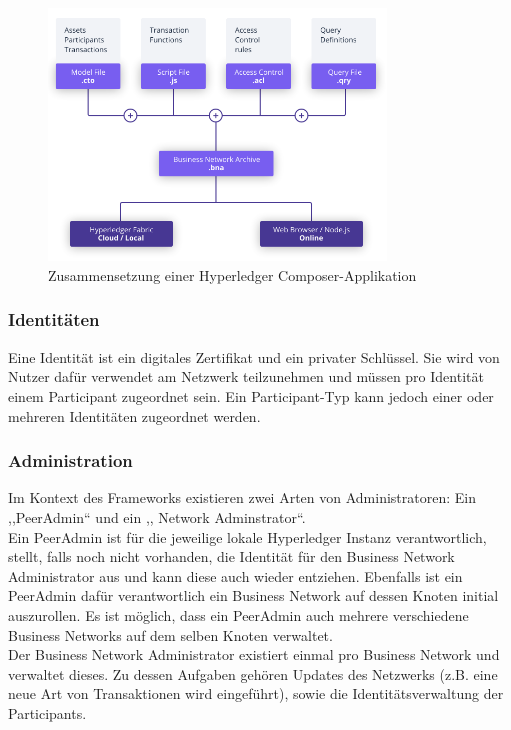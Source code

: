             \begin{figure}[H]
        		\centering
        		\includegraphics[width=0.8\textwidth]{graphics/Composer-Diagram.png}
        		\caption[Zusammensetzung einer Hyperledger Composer-Applikation]{Zusammensetzung einer Hyperledger Composer-Applikation\cite{ComposerDocs}}
        		\label{fig:composer_arch}
        	\end{figure}
        \newpage
        \subsubsection*{Identitäten}
            Eine Identität ist ein digitales Zertifikat und ein privater Schlüssel.
            Sie wird von Nutzer dafür verwendet am Netzwerk teilzunehmen und müssen pro Identität einem Participant zugeordnet sein.
            Ein Participant-Typ kann jedoch einer oder mehreren Identitäten zugeordnet werden.
            
        \subsubsection*{Administration}
            Im Kontext des Frameworks existieren zwei Arten von Administratoren: Ein ,,PeerAdmin`` und ein ,, Network Adminstrator``.\\
            Ein PeerAdmin ist für die jeweilige lokale Hyperledger Instanz verantwortlich, stellt, falls noch nicht vorhanden, die Identität für den Business Network Administrator aus und kann diese auch wieder entziehen. 
            Ebenfalls ist ein PeerAdmin dafür verantwortlich ein Business Network auf dessen Knoten initial auszurollen.
            Es ist möglich, dass ein PeerAdmin auch mehrere verschiedene Business Networks auf dem selben Knoten verwaltet.
            \medskip\\
            Der Business Network Administrator existiert einmal pro Business Network und verwaltet dieses.
            Zu dessen Aufgaben gehören Updates des Netzwerks (z.B. eine neue Art von Transaktionen wird eingeführt), sowie die Identitätsverwaltung der Participants.

